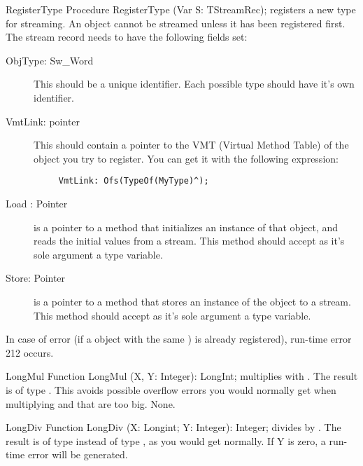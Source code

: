 \begin{procedure}{RegisterType}
\Declaration
Procedure RegisterType (Var S: TStreamRec);
\Description
{} registers a new type for streaming. An object cannot
be streamed unless it has been registered first. 
The stream record  needs to have the following fields set:

\begin{description}
\item[ObjType: Sw\_Word] This should be a unique identifier. Each possible
type should have it's own identifier. 
\item[VmtLink: pointer] This should contain a pointer to the VMT (Virtual
Method Table) of the object you try to register. You can get it with the
following expression:
\begin{verbatim}
     VmtLink: Ofs(TypeOf(MyType)^);
\end{verbatim}
\item[Load : Pointer] is a pointer to a method that initializes an instance
of that object, and reads the initial values from a stream. This method
should accept as it's sole argument a  type variable.
\item[Store: Pointer]is a pointer to a method that stores an instance of the
object to a stream. This method should accept as it's sole argument
 a  type variable.
\end{description}
\Errors
In case of error (if a object with the same ) is already
registered), run-time error 212 occurs.
\end{procedure}

\begin{function}{LongMul}
\Declaration
Function LongMul (X, Y: Integer): LongInt;
\Description
{} multiplies  with . The result is of
type . This avoids possible overflow errors you would normally
get when multiplying  and  that are too big.
\Errors
None.
\SeeAlso
{}
\end{function}

\begin{function}{LongDiv}
\Declaration
Function LongDiv (X: Longint; Y: Integer): Integer;
\Description
{} divides  by . The result is of
type  instead of type , as you would get 
normally. 
\Errors
If Y is zero, a run-time error will be generated.
\SeeAlso
{}
\end{function}

